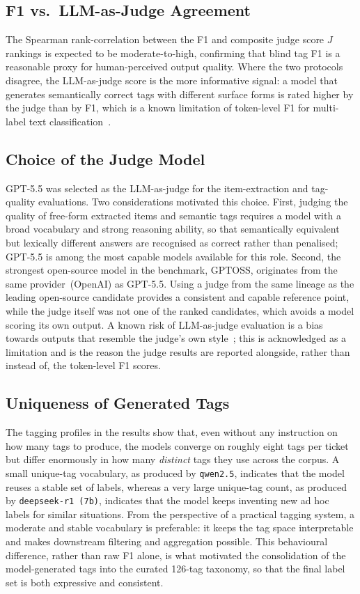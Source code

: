 \subsection{F1 vs.\ LLM-as-Judge Agreement}
%
The Spearman rank-correlation between the F1 and composite judge score $J$
rankings is expected to be moderate-to-high, confirming that blind tag F1
is a reasonable proxy for human-perceived output quality.  Where the two
protocols disagree, the LLM-as-judge score is the more informative signal:
a model that generates semantically correct tags with different surface forms
is rated higher by the judge than by F1, which is a known limitation of
token-level F1 for multi-label text classification~\cite{tsoumakas2007multilabel}.

\subsection{Choice of the Judge Model}
\label{sec:disc-judge-choice}
%
GPT-5.5 was selected as the LLM-as-judge for the item-extraction and tag-quality
evaluations.  Two considerations motivated this choice.  First, judging the
quality of free-form extracted items and semantic tags requires a model with a
broad vocabulary and strong reasoning ability, so that semantically equivalent
but lexically different answers are recognised as correct rather than penalised;
GPT-5.5 is among the most capable models available for this role.  Second, the
strongest open-source model in the benchmark, GPTOSS, originates from the same
provider~(OpenAI) as GPT-5.5.  Using a judge from the same lineage as the leading
open-source candidate provides a consistent and capable reference point, while
the judge itself was not one of the ranked candidates, which avoids a model
scoring its own output.  A known risk of LLM-as-judge evaluation is a bias
towards outputs that resemble the judge's own style~\cite{zheng2024judging};
this is acknowledged as a limitation and is the reason the judge results are
reported alongside, rather than instead of, the token-level F1 scores.

\subsection{Uniqueness of Generated Tags}
\label{sec:disc-tag-uniqueness}
%
The tagging profiles in the results show that, even without any instruction on
how many tags to produce, the models converge on roughly eight tags per ticket
but differ enormously in how many \emph{distinct} tags they use across the
corpus.  A small unique-tag vocabulary, as produced by \texttt{qwen2.5},
indicates that the model reuses a stable set of labels, whereas a very large
unique-tag count, as produced by \texttt{deepseek-r1~(7b)}, indicates that the
model keeps inventing new ad hoc labels for similar situations.  From the
perspective of a practical tagging system, a moderate and stable vocabulary is
preferable: it keeps the tag space interpretable and makes downstream filtering
and aggregation possible.  This behavioural difference, rather than raw F1 alone,
is what motivated the consolidation of the model-generated tags into the curated
126-tag taxonomy, so that the final label set is both expressive and consistent.

